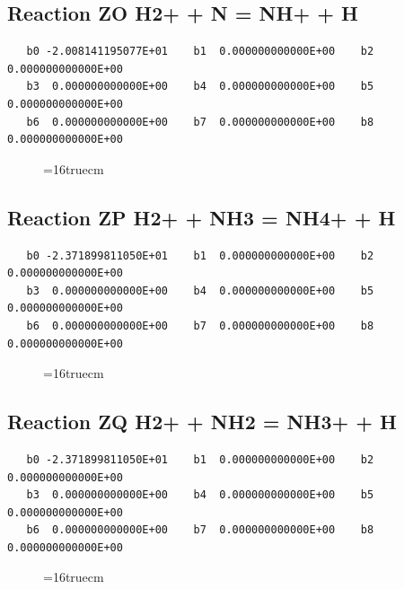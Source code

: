 \documentclass[12pt,dvipdfm]{article}
\begin{document}
\subsection{
Reaction ZO H2+ + N = NH+ + H}
\begin{small}\begin{verbatim}
   b0 -2.008141195077E+01    b1  0.000000000000E+00    b2  0.000000000000E+00
   b3  0.000000000000E+00    b4  0.000000000000E+00    b5  0.000000000000E+00
   b6  0.000000000000E+00    b7  0.000000000000E+00    b8  0.000000000000E+00
   \end{verbatim}\end{small}
\begin{figure}[h!]
\label{n2rates}
\epsfxsize=16truecm
\end{figure}
\newpage

\subsection{
Reaction ZP H2+ + NH3 = NH4+ + H}
\begin{small}\begin{verbatim}
   b0 -2.371899811050E+01    b1  0.000000000000E+00    b2  0.000000000000E+00
   b3  0.000000000000E+00    b4  0.000000000000E+00    b5  0.000000000000E+00
   b6  0.000000000000E+00    b7  0.000000000000E+00    b8  0.000000000000E+00
   \end{verbatim}\end{small}
\begin{figure}[h!]
\label{n2rates}
\epsfxsize=16truecm
\end{figure}
\newpage

\subsection{
Reaction ZQ H2+ + NH2 = NH3+ + H}
\begin{small}\begin{verbatim}
   b0 -2.371899811050E+01    b1  0.000000000000E+00    b2  0.000000000000E+00
   b3  0.000000000000E+00    b4  0.000000000000E+00    b5  0.000000000000E+00
   b6  0.000000000000E+00    b7  0.000000000000E+00    b8  0.000000000000E+00
   \end{verbatim}\end{small}
\begin{figure}[h!]
\label{n2rates}
\epsfxsize=16truecm
\end{figure}
\newpage
\end{document}
